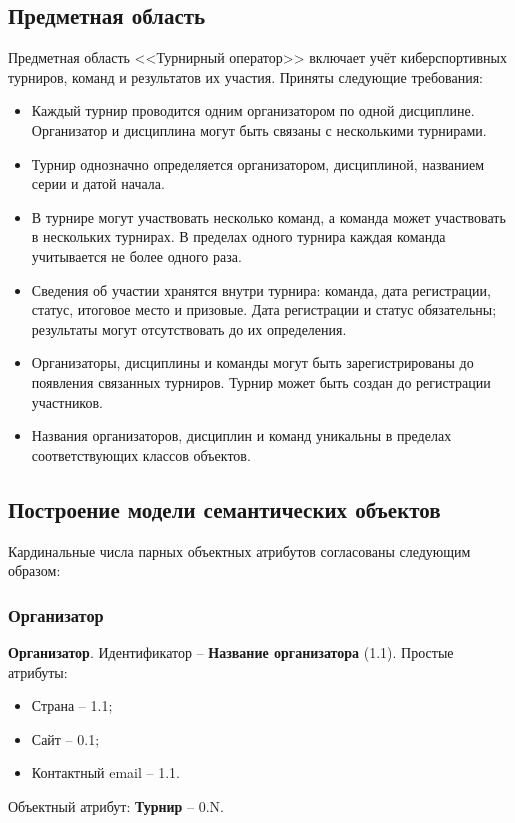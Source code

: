 \documentclass[a4paper, 14pt]{extarticle}
\begin{document}
\subsection{Предметная область}
\label{subsec:subject}

Предметная область <<Турнирный оператор>> включает учёт киберспортивных турниров, команд и результатов их участия. Приняты следующие требования:

\begin{itemize}
  \item Каждый турнир проводится одним организатором по одной дисциплине. Организатор и дисциплина могут быть связаны с несколькими турнирами.
  \item Турнир однозначно определяется организатором, дисциплиной, названием серии и датой начала.
  \item В турнире могут участвовать несколько команд, а команда может участвовать в нескольких турнирах. В пределах одного турнира каждая команда учитывается не более одного раза.
  \item Сведения об участии хранятся внутри турнира: команда, дата регистрации, статус, итоговое место и призовые. Дата регистрации и статус обязательны; результаты могут отсутствовать до их определения.
  \item Организаторы, дисциплины и команды могут быть зарегистрированы до появления связанных турниров. Турнир может быть создан до регистрации участников.
  \item Названия организаторов, дисциплин и команд уникальны в пределах соответствующих классов объектов.
\end{itemize}

\subsection{Построение модели семантических объектов}
\label{subsec:model}

Кардинальные числа парных объектных атрибутов согласованы следующим образом:

\subsubsection{Организатор}

\textbf{Организатор}. Идентификатор -- \textbf{Название организатора} (1.1). Простые атрибуты:
  \begin{itemize}
    \item Страна -- 1.1;
    \item Сайт -- 0.1;
    \item Контактный email -- 1.1.
  \end{itemize}
  Объектный атрибут: \textbf{Турнир} -- 0.N.
\end{document}
